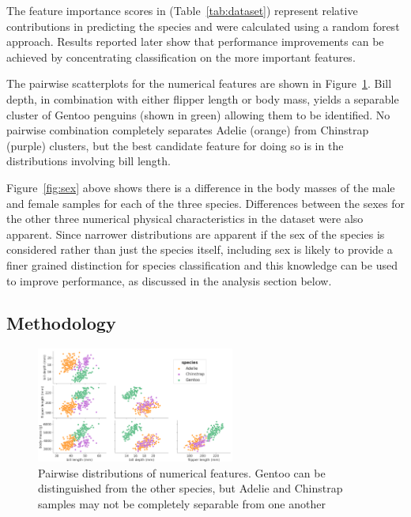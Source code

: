 \documentclass[12pt]{article}
\begin{document}
The feature importance scores in (Table~\ref{tab:dataset}) represent 
relative contributions in predicting the species and were calculated using a random forest approach.
Results reported later show that performance improvements can be achieved by
concentrating classification on the more important features.

The pairwise scatterplots for the numerical features are shown in Figure~\ref{fig:pairwise}. 
Bill depth, in combination with either flipper length or body mass, 
yields a separable cluster of Gentoo penguins (shown in green) allowing them to be identified. 
No pairwise combination completely separates Adelie (orange) from Chinstrap (purple) clusters, 
but the best candidate feature for doing so is in the distributions involving bill length.

Figure~\ref{fig:sex} above shows there is a difference in the body masses of the male and female samples for each of the three species. 
Differences between the sexes for the other three numerical physical characteristics in the dataset were also apparent. 
Since narrower distributions are apparent if the sex of the species is considered rather than just the species itself, 
including sex is likely to provide a finer grained distinction for species classification 
and this knowledge can be used to improve performance, as discussed in the analysis section below. 

\subsection*{Methodology}

\begin{figure} %
  \centering
  \vspace{-3\baselineskip} %
  \includegraphics[width=0.58\textwidth]{pairwise.png} %
  \vspace{-0.5\baselineskip} %
  \caption{Pairwise distributions of numerical features. Gentoo can be distinguished from the other species, 
  but Adelie and Chinstrap samples may not be completely separable from one another}
  \vspace{-0.5\baselineskip} %
  \label{fig:pairwise}
\end{figure}
\end{document}
